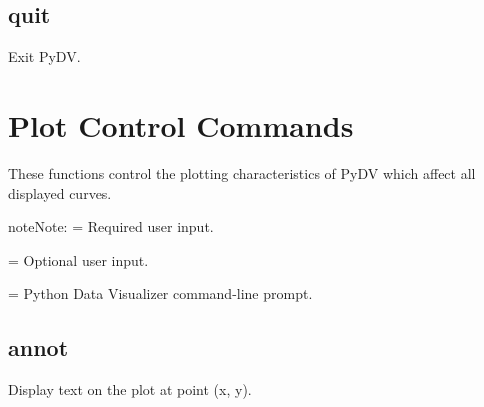 \documentclass[letterpaper,10pt,english]{sphinxmanual}
\begin{document}
\begin{sphinxVerbatim}[commandchars=\\\{\}]
\PYG{p}{[}\PYG{p}{]}  
\end{sphinxVerbatim}


\subsection{quit}
\label{\detokenize{env_control_cmds:quit}}
Exit PyDV. 

\begin{sphinxVerbatim}[commandchars=\\\{\}]
\PYG{p}{[}\PYG{p}{]} 
\end{sphinxVerbatim}


\section{Plot Control Commands}
\label{\detokenize{plot_control_cmds:plot-control-commands}}\label{\detokenize{plot_control_cmds:id1}}\label{\detokenize{plot_control_cmds::doc}}
These functions control the plotting characteristics of PyDV which affect all displayed curves.

\begin{sphinxadmonition}{note}{Note:}
\sphinxstylestrong{\textless{} \textgreater{}} = Required user input.

\sphinxstylestrong{{[} {]}} = Optional user input.

\sphinxstylestrong{{[}PyDV{]}:} = Python Data Visualizer command-line prompt.
\end{sphinxadmonition}


\subsection{annot}
\label{\detokenize{plot_control_cmds:annot}}
Display text on the plot at point (x, y).

\begin{sphinxVerbatim}[commandchars=\\\{\}]
\PYG{p}{[}\PYG{p}{]}    
\end{sphinxVerbatim}
\end{document}
